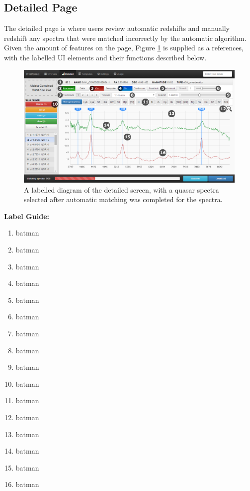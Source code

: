\documentclass[titlesmallcaps, examinerscopy, copyrightpage]{uqthesis}
\begin{document}
\subsection{Detailed Page}

The detailed page is where users review automatic redshifts and manually redshift any spectra that were matched incorrectly by the automatic algorithm. Given the amount of features on the page, Figure \ref{fig:detailed} is supplied as a references, with the labelled UI elements and their functions described below.

\begin{figure}[ht!]
\includegraphics[width=1\textwidth]{images/detailed2.png} 
\centering
\caption{A labelled diagram of the detailed screen, with a quasar spectra selected after automatic matching was completed for the spectra.}
\label{fig:detailed}
\end{figure}

\textbf{Label Guide:}
\begin{enumerate}
\item batman
\item batman
\item batman
\item batman
\item batman
\item batman
\item batman
\item batman
\item batman
\item batman
\item batman
\item batman
\item batman
\item batman
\item batman
\item batman
\end{enumerate}
\end{document}
